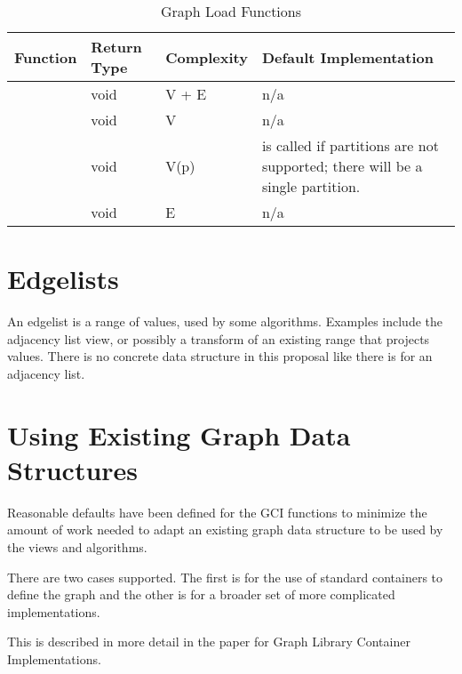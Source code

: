 \begin{table}[h!]
\begin{center}
\resizebox{\textwidth}{!}
{\begin{tabular}{l l p{1.5cm} L{7.0cm}}
\hline
    \textbf{Function} & \textbf{Return Type} & \textbf{Complexity} & \textbf{Default Implementation} \\
\hline
     & void & V + E & n/a \\
     & void & V & n/a \\
     & void & V(p) &  is called if partitions are not supported; there will be a single partition. \\
     & void & E & n/a \\
\hline
\end{tabular}}
\caption{Graph Load Functions}
\label{tab:load_func}
\end{center}
\end{table}

\section{Edgelists}
An edgelist is a range of  values, used by some algorithms. Examples include the  adjacency 
list view, or possibly a transform of an existing range that projects  values. There is no concrete data
structure in this proposal like there is for an adjacency list.

\section{Using Existing Graph Data Structures}
Reasonable defaults have been defined for the GCI functions to minimize the amount of work
needed to adapt an existing graph data structure to be used by the views and algorithms.

There are two cases supported. The first is for the use of standard containers to define the graph and the other
is for a broader set of more complicated implementations.

This is described in more detail in the paper for Graph Library Container Implementations.
